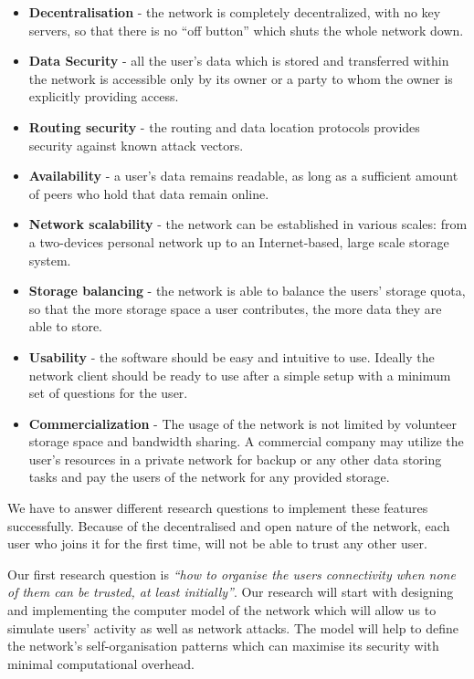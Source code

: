 \begin{itemize}
\item \textbf{Decentralisation} - the network is completely decentralized,
      with no key servers, so that there is no ``off button'' which shuts
      the whole network down.
\item \textbf{Data Security} - all the user's data which is stored and transferred
      within the network is accessible only by its owner or a party to whom the
      owner is explicitly providing access.
\item \textbf{Routing security} - the routing and data location protocols
      provides security against known attack vectors.
\item \textbf{Availability} - a user's data remains readable,
      as long as a sufficient amount of peers who hold that data remain online.
\item \textbf{Network scalability} - the network can be established in various
      scales: from a two-devices personal network up to an Internet-based,
      large scale storage system.
\item \textbf{Storage balancing} - the network is able to balance the users'
      storage quota, so that the more storage space a user contributes,
      the more data they are able to store.
\item \textbf{Usability} - the software should be easy and intuitive to
      use. Ideally the network client should be ready to use after a
      simple setup with a minimum set of questions for the user.
\item \textbf{Commercialization} - The usage of the network is not limited
      by volunteer storage space and bandwidth sharing. A commercial company
      may utilize the user's resources in a private network for backup or any
      other data storing tasks and pay the users of the network for any
      provided storage.
\end{itemize}

We have to answer different research questions to implement these features
successfully. Because of the decentralised and open nature of the network,
each user who joins it for the first time,  will not be able to trust any
other user.

Our first research question is \emph{``how to organise the users connectivity
when none of them can be trusted, at least initially''}.
Our research will start with designing and implementing the computer model
of the network which will allow us to simulate users' activity as well as
\pp network attacks. The model will help to define the network's
self-organisation patterns which can maximise its security with minimal
computational overhead.


